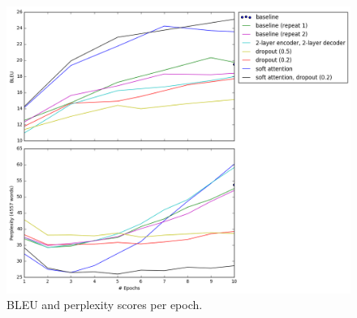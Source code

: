 \documentclass[answers]{exam}
\begin{document}
\begin{CJK}{UTF8}{min}
\begin{figure}
  \centering
  \includegraphics[width=\linewidth]{fig-bleu-pplx}
  \caption{BLEU and perplexity scores per epoch.}
  \label{fig:bleu-pplx}
\end{figure}

\end{CJK}
\end{document}
